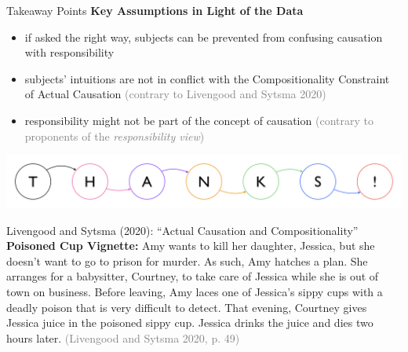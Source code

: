 \documentclass[xcolor=table,9pt,aspectratio=169]{beamer}
\begin{document}
\begin{frame}{\vspace*{10mm}Takeaway Points}
\vspace*{-5mm}
\textbf{Key Assumptions in Light of the Data}
\begin{itemize}
   \item if asked the right way, subjects can be prevented from confusing causation with responsibility
   \item subjects' intuitions are not in conflict with the Compositionality Constraint of Actual Causation \textcolor{gray}{(contrary to Livengood and Sytsma 2020)}
   \item responsibility might not be part of the concept of causation \textcolor{gray}{(contrary to proponents of the \textit{responsibility view})}
\end{itemize}
\vfill
\end{frame}


\begin{frame}{}
\vspace*{-5mm}
\begin{center}
   {\includegraphics[width=\linewidth]{figures/thanks.pdf}}
\end{center}
\end{frame}


\begin{frame}{\vspace*{10mm}Livengood and Sytsma (2020): ``Actual Causation and Compositionality''}
\vspace*{-5mm}
\textbf{Poisoned Cup Vignette:} Amy wants to kill her daughter, Jessica, but she doesn't want to go to prison for murder. As such, Amy hatches a plan. She arranges for a babysitter, Courtney, to take care of Jessica while she is out of town on business. Before leaving, Amy laces one of Jessica's sippy cups with a deadly poison that is very difficult to detect. That evening, Courtney gives Jessica juice in the poisoned sippy cup. Jessica drinks the juice and dies two hours later. \textcolor{gray}{(Livengood and Sytsma 2020, p. 49)}
\end{frame}
\end{document}
